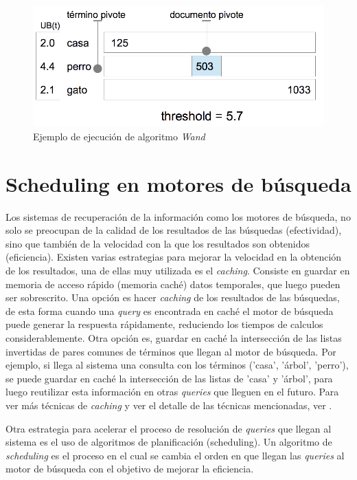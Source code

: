 \begin{figure}[H]
\centering
\includegraphics[scale=.75]{images/proceso_wand.png}
\caption{Ejemplo de ejecución de algoritmo  \textit{Wand}}
\label{fig:proceso_wand}
\end{figure}


\section{Scheduling en motores de búsqueda}
\label{marco:scheduling}
Los sistemas de recuperación de la información como los motores de búsqueda, no solo se preocupan de la calidad de los resultados de las búsquedas (efectividad), sino que también de la velocidad con la que los resultados son obtenidos (eficiencia). Existen varias estrategias para mejorar la velocidad en la obtención de los resultados, una de ellas muy utilizada es el \textit{caching}. Consiste en guardar en memoria de acceso rápido (memoria caché) datos temporales, que luego pueden ser sobrescrito. Una opción es hacer \textit{caching} de los resultados de las búsquedas, de esta forma cuando una \textit{query} es encontrada en caché el motor de búsqueda puede generar la respuesta rápidamente, reduciendo los tiempos de calculos considerablemente. Otra opción es, guardar en caché la intersección de las listas invertidas de pares comunes de términos que llegan al motor de búsqueda. Por ejemplo, si llega al sistema una consulta con los términos ('casa', 'árbol', 'perro'), se puede guardar en caché la intersección de las listas de 'casa' y 'árbol', para luego reutilizar esta información en otras \textit{queries} que lleguen en el futuro. Para ver más técnicas de \textit{caching} y ver el detalle de las técnicas mencionadas, ver \citep{Buttcher:2010}.

Otra estrategia para acelerar el proceso de resolución de \textit{queries} que llegan al sistema es el uso de algoritmos de planificación (scheduling). Un algoritmo de \textit{scheduling} es el proceso en el cual se cambia el orden en que llegan las \textit{queries} al motor de búsqueda con el objetivo de mejorar la eficiencia. 


